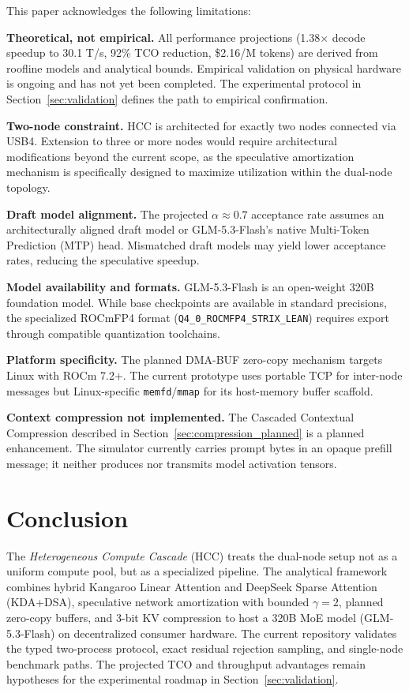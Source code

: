 \documentclass[11pt,a4paper]{article}
\begin{document}
This paper acknowledges the following limitations:

\textbf{Theoretical, not empirical.} All performance projections (1.38$\times$ decode speedup to 30.1 T/s, 92\% TCO reduction, \$2.16/M tokens) are derived from roofline models and analytical bounds. Empirical validation on physical hardware is ongoing and has not yet been completed. The experimental protocol in Section~\ref{sec:validation} defines the path to empirical confirmation.

\textbf{Two-node constraint.} HCC is architected for exactly two nodes connected via USB4. Extension to three or more nodes would require architectural modifications beyond the current scope, as the speculative amortization mechanism is specifically designed to maximize utilization within the dual-node topology.

\textbf{Draft model alignment.} The projected $\alpha \approx 0.7$ acceptance rate assumes an architecturally aligned draft model or GLM-5.3-Flash's native Multi-Token Prediction (MTP) head. Mismatched draft models may yield lower acceptance rates, reducing the speculative speedup.

\textbf{Model availability and formats.} GLM-5.3-Flash is an open-weight 320B foundation model. While base checkpoints are available in standard precisions, the specialized ROCmFP4 format (\texttt{Q4\_0\_ROCMFP4\_STRIX\_LEAN}) requires export through compatible quantization toolchains.

\textbf{Platform specificity.} The planned DMA-BUF zero-copy mechanism targets Linux with ROCm 7.2+. The current prototype uses portable TCP for inter-node messages but Linux-specific \texttt{memfd}/\texttt{mmap} for its host-memory buffer scaffold.

\textbf{Context compression not implemented.} The Cascaded Contextual Compression described in Section~\ref{sec:compression_planned} is a planned enhancement. The simulator currently carries prompt bytes in an opaque prefill message; it neither produces nor transmits model activation tensors.

\section{Conclusion}

The \textit{Heterogeneous Compute Cascade} (HCC) treats the dual-node setup not as a uniform compute pool, but as a specialized pipeline. The analytical framework combines hybrid Kangaroo Linear Attention and DeepSeek Sparse Attention (KDA+DSA), speculative network amortization with bounded $\gamma=2$, planned zero-copy buffers, and 3-bit KV compression to host a 320B MoE model (GLM-5.3-Flash) on decentralized consumer hardware. The current repository validates the typed two-process protocol, exact residual rejection sampling, and single-node benchmark paths. The projected TCO and throughput advantages remain hypotheses for the experimental roadmap in Section~\ref{sec:validation}.
\end{document}
